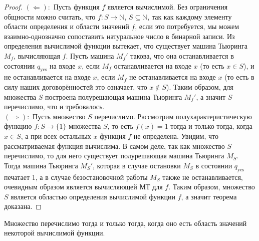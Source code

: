 \documentclass[11pt]{article}
\begin{document}
\begin{proof}
    $(\Longleftarrow):$ Пусть функция $f$ является вычислимой. Без ограничения общности можно считать, что $f \colon S \to \mathbb{N}$, $S \subseteq \mathbb{N}$, так как каждому элементу области определения и области значений $f$, если это потребуется, мы можем взаимно-однозначно сопоставить натуральное число в бинарной записи. Из определения вычислимой функции вытекает, что существует машина Тьюринга $M_f$, вычисляющая $f$. Пусть машина $M_f'$ такова, что она останавливается в состоянии $q_{\text{yes}}$ на входе $x$, если $M_f$ останавливается на входе $x$ (то есть $x \in S$), и не останавливается на входе $x$, если $M_f$ не останавливается на входе $x$ (то есть в силу наших договорённостей это означает, что $x \not \in S$). Таким образом, для множества $S$ построена полурешающая машина Тьюринга $M_f'$, а значит $S$ перечислимо, что и требовалось. \\
    $(\Longrightarrow):$ Пусть множество $S$ перечислимо. Рассмотрим полухарактеристическую функцию $f \colon S \to \{1\}$ множества $S$, то есть $f(x) = 1$ тогда и только тогда, когда $x \in S$, а при всех остальных $x$ функция $f$ не определена. Увидим, что рассматриваемая функция вычислима. В самом деле, так как множество $S$ перечислимо, то для него существует полурешающая машина Тьюринга $M_S$. Тогда машина Тьюринга $M_S'$, которая в случае остановки $M_S$ в состоянии $q_{\text{yes}}$ печатает $1$, а в случае безостановочной работы $M_S$ также не останавливается, очевидным образом является вычисляющей МТ для $f$. Таким образом, множество $S$ является областью определения вычислимой функции $f$, а значит теорема доказана.
\end{proof}

\begin{theorem}
    Множество перечислимо тогда и только тогда, когда оно есть область значений некоторой вычислимой функции.
\end{theorem}
\end{document}

